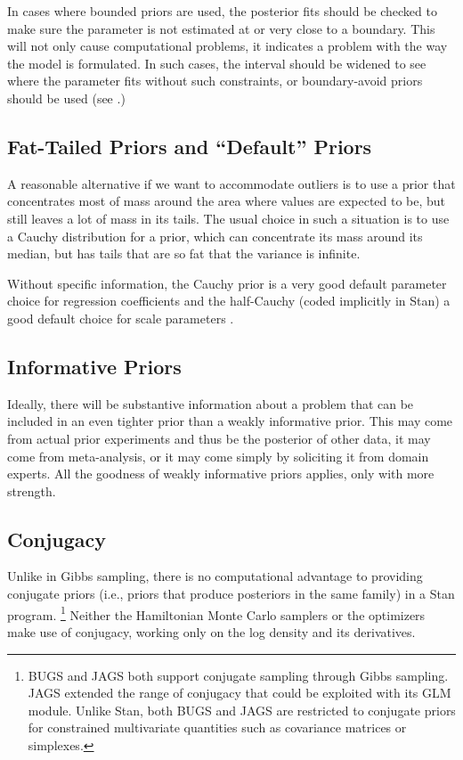 In cases where bounded priors are used, the posterior fits should be
checked to make sure the parameter is not estimated at or very close
to a boundary.  This will not only cause computational problems, it
indicates a problem with the way the model is formulated.  In such
cases, the interval should be widened to see where the parameter fits
without such constraints, or boundary-avoid priors should be used (see
.)

\subsection{Fat-Tailed Priors and ``Default'' Priors}

A reasonable alternative if we want to accommodate outliers is to use a
prior that concentrates most of mass around the area where values are
expected to be, but still leaves a lot of mass in its tails.  The
usual choice in such a situation is to use a Cauchy distribution for a
prior, which can concentrate its mass around its median, but has tails
that are so fat that the variance is infinite.

Without specific information, the Cauchy prior is a very good default
parameter choice for regression coefficients
\citep{GelmanJakulinPittauEtAl:2008} and the half-Cauchy (coded
implicitly in Stan) a good default choice for scale parameters
\citep{Gelman:2006}.



\subsection{Informative Priors}

Ideally, there will be substantive information about a problem that
can be included in an even tighter prior than a weakly informative
prior.  This may come from actual prior experiments and thus be the
posterior of other data, it may come from meta-analysis, or it may
come simply by soliciting it from domain experts.  All the goodness of
weakly informative priors applies, only with more strength.

\subsection{Conjugacy}

Unlike in Gibbs sampling, there is no computational advantage to
providing conjugate priors (i.e., priors that produce posteriors in
the same family) in a Stan program.%
%
\footnote{BUGS and JAGS both support conjugate sampling through Gibbs
  sampling.  JAGS extended the range of conjugacy that could be
  exploited with its GLM module.  Unlike Stan, both BUGS and JAGS are
  restricted to conjugate priors for constrained multivariate
  quantities such as covariance matrices or simplexes.}
%
Neither the Hamiltonian Monte Carlo samplers or the optimizers make
use of conjugacy, working only on the log density and its derivatives.



